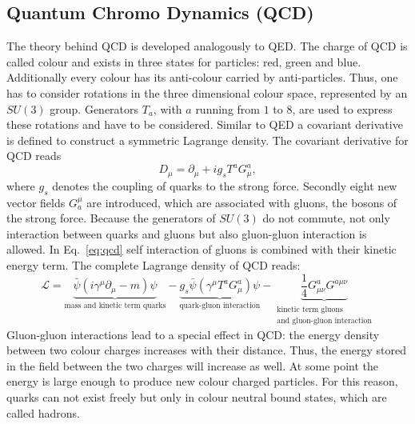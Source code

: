 	\subsection{Quantum Chromo Dynamics (QCD)}
	The theory behind QCD is developed analogously to QED. The charge of QCD is called colour and exists in three states for particles: red, green and blue. Additionally every colour has its anti-colour carried by anti-particles. Thus, one has to consider rotations in the three dimensional colour space, represented by an $SU(3)$ group. Generators $T_a$, with $a$ running from $1$ to $8$, are used to express these rotations and have to be considered. Similar to QED a covariant derivative is defined to construct a symmetric Lagrange density. The covariant derivative for QCD reads
	\begin{equation}
	D_\mu = \partial_\mu + i g_s T^a G^a_{\mu},
	\end{equation}
	where $g_s$ denotes the coupling of quarks to the strong force. Secondly eight new vector fields $G_a^\mu$ are introduced, which are associated with gluons, the bosons of the strong force. Because the generators of $SU(3)$ do not commute, not only interaction between quarks and gluons but also gluon-gluon interaction is allowed. In Eq.~\ref{eq:qcd} self interaction of gluons is combined with their kinetic energy term. The complete Lagrange density of QCD reads:
	\begin{equation}
	\mathcal{L} = \underbrace{\bar{\psi}(i \gamma^\mu \partial_\mu -m ) \psi}_{\text{mass and kinetic term quarks}} - \underbrace{g_s \bar{\psi}(\gamma^\mu T^a G^a_\mu) \psi}_{\text{quark-gluon interaction}} - \underbrace{\frac{1}{4} G^a_{\mu \nu}G^{a \mu \nu}}_{\substack{\text{kinetic term gluons} \\ \text{and gluon-gluon interaction}}}
	\label{eq:qcd}
	\end{equation}
	Gluon-gluon interactions lead to a special effect in QCD: the energy density between two colour charges increases with their distance. Thus, the energy stored in the field between the two charges will increase as well. At some point the energy is large enough to produce new colour charged particles. For this reason, quarks can not exist freely but only in colour neutral bound states, which are called hadrons.
